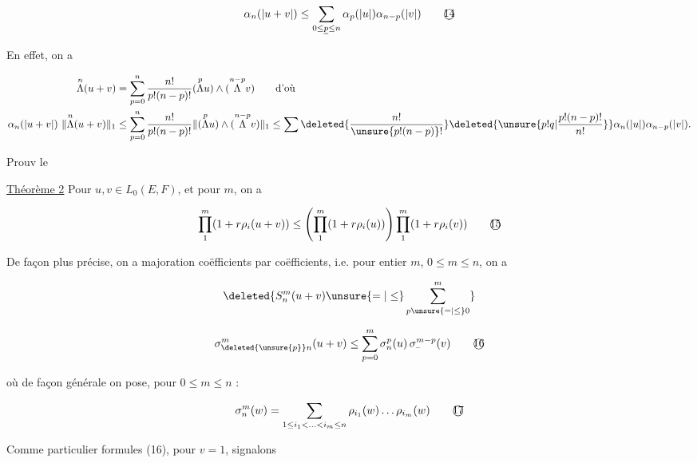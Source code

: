 \[
\alpha_n(|u+v|)\leq\sum_{0\leq\underline{p}\leq n}\alpha_p(|u|)\alpha_{n-p}(|v|)\tag*{\textcircled{14}}
\]

En effet, on a  

\[
\begin{aligned}
\overset{n}{\Lambda}(u+v)&=\sum_{p=0}^n\frac{n!}{p!(n-p)!}(\overset{p}{\Lambda}u)\wedge(\overset{n-p}{\Lambda}v)\qquad\text{d'où}\\
\alpha_n(|u+v|)\ \lVert\overset{n}{\Lambda}(u+v)\rVert_1
&\leq\sum_{p=0}^n\frac{n!}{p!(n-p)!}\lVert(\overset{p}{\Lambda}u)\wedge(\overset{n-p}{\Lambda}v)\rVert_1\leq\sum\deleted{\frac{n!}{\unsure{p!(n-p)}!}}\deleted{\unsure{p!q|\frac{p!(n-p)!}{n!}}}\alpha_{n}(|u|)\alpha_{n-p}(|v|).
\end{aligned}
\]

Prouv le

\uline{Théorème 2} Pour $u,v\in L_0(E,F)$,  et pour  $m$, on a

\[
\prod_1^m(1+r\rho_i(u+v))\leq\left(\prod_1^m(1+r\rho_i(u))\right)\prod_1^m(1+r\rho_i(v))\tag*{\textcircled{15}}
\]

De façon plus précise, on a majoration coëfficients par coëfficients, i.e. pour  entier  $m$, $0\leq m\leq n$, on a

\[
\deleted{S_n^m(u+v)\unsure{=|\leq}\sum_{p\unsure{=|\leq}0}^{m}}
\]

\[
\sigma_{\deleted{\unsure{p}}n}^{m}(u+v)\leq\sum_{p=0}^m\sigma_n^p(u)\,\sigma_{\text{--}}^{m-p}(v)\tag*{\textcircled{16}}
\]


où de façon générale on pose, pour  $0\leq m\leq n$ :

\[
\sigma_n^m(w)=\sum_{1\leq i_1<\ldots<i_m\leq n}\rho_{i_1}(w)\ldots\rho_{i_m}(w)\tag*{\textcircled{17}}
\]

Comme  particulier  formules (16), pour $v=1$, signalons 
